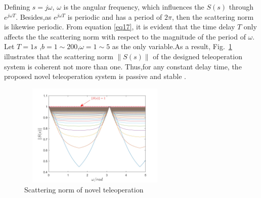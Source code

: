 \par Defining $s = j\omega$,
$\omega$ is the angular frequency, which influences the $S(s)$ through $e^{j\omega T}$.
Besides,as $e^{j\omega T}$ is periodic and has a period of $2\pi$,
then the scattering norm is likewise periodic.
From equation \eqref{eq17}, it is evident that the time delay $T$ only affects the
the scattering norm with respect to the magnitude of the period of $\omega$.
Let $T = 1s$ ,$b=1 \sim 200$,$\omega = 1 \sim 5$ as the only variable.As a result,
Fig.~\ref{fig5} illustrates that the scattering norm $\left\| S(s) \right\|$ of
the designed teleoperation system is coherent not more than one.
Thus,for any constant delay time,
the proposed novel teleoperation system is passive and stable .
\begin{figure}[htbp]
    \centerline{\includegraphics[height=4.9cm,width=7.4cm]{S.jpg}}
    \caption{Scattering norm of novel teleoperation}
    \label{fig5}
\end{figure}

